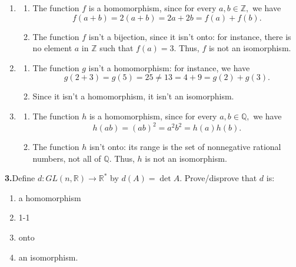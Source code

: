 \documentclass[10pt,]{book}
\theoremstyle{plain}
\theoremstyle{definition}
\theoremstyle{definition}
\theoremstyle{definition}
\theoremstyle{definition}
\numberwithin{equation}{section}
\def\Z{\mathbb{Z}}
\def\R{\mathbb{R}}
\def\Q{\mathbb{Q}}
\begin{document}
\begin{enumerate}[label=(\alph*)]
\item\hypertarget{li-159}{}%
\begin{enumerate}[label=\roman*.]
\item\hypertarget{li-160}{}The function \(f\) is a homomorphism, since for every \(a,b \in
\Z,\) we have%
\begin{equation*}
f(a+b)=2(a+b)=2a+2b=f(a)+f(b).
\end{equation*}
%
\item\hypertarget{li-161}{}The function \(f\) isn't a bijection, since it isn't onto: for instance, there is no element \(a\) in \(\Z\) such that \(f(a)=3\). Thus, \(f\) is not an isomorphism.%
\end{enumerate}
%
\item\hypertarget{li-162}{}%
\begin{enumerate}[label=\roman*.]
\item\hypertarget{li-163}{}The function \(g\) isn't a homomorphism: for instance, we have%
\begin{equation*}
g(2+3)=g(5)=25\neq 13=4+9=g(2)+g(3).
\end{equation*}
%
\item\hypertarget{li-164}{}Since it isn't a homomorphism, it isn't an isomorphism.%
\end{enumerate}
%
\item\hypertarget{li-165}{}%
\begin{enumerate}[label=\roman*.]
\item\hypertarget{li-166}{}The function \(h\) is a homomorphism, since for every \(a,b \in
\Q,\) we have%
\begin{equation*}
h(ab)=(ab)^2=a^2b^2=h(a)h(b).
\end{equation*}
%
\item\hypertarget{li-167}{}The function \(h\) isn't onto: its range is the set of nonnegative rational numbers, not all of \(\Q\). Thus, \(h\) is not an isomorphism.%
\end{enumerate}
%
\end{enumerate}
\par\smallskip
\noindent\textbf{3.}\quad{}Define \(d : GL(n,\R)\to \R^*\) by \(d(A)=\det A\). Prove/disprove that \(d\) is: \leavevmode%
\begin{enumerate}[label=(\alph*)]
\item\hypertarget{li-168}{}a homomorphism%
\item\hypertarget{li-169}{}1-1%
\item\hypertarget{li-170}{}onto%
\item\hypertarget{li-171}{}an isomorphism.%
\end{enumerate}
\end{document}
